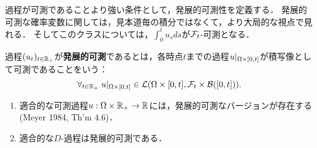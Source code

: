 \documentclass[uplatex,dvipdfmx]{jsreport}
\begin{document}
\begin{tcolorbox}[colframe=ForestGreen, colback=ForestGreen!10!white,breakable,colbacktitle=ForestGreen!40!white,coltitle=black,fonttitle=\bfseries\sffamily,
title=発展的可測性とは$\P/\B(\R)$-可測性である]
    過程が可測であることより強い条件として，発展的可測性を定義する．
    発展的可測な確率変数に関しては，見本道毎の積分ではなくて，より大局的な視点で見れる．
    そしてこのクラスについては，$\int^t_0u_sds$が$\mathcal{F}_t$-可測となる．
\end{tcolorbox}

\begin{definition}
    過程$(u_t)_{t\in\mathbb{R}_+}$が\textbf{発展的可測}であるとは，各時点$t$までの過程$u|_{\Omega\times[0,t]}$が積写像として可測であることをいう：
    \[\forall_{t\in\mathbb{R}_+}\;u|_{\Omega\times[0,t]}\in\mathcal{L}(\Omega\times[0,t],\mathcal{F}_t\times\mathcal{B}([0,t])).\]
\end{definition}

\begin{lemma}[発展的可測性の十分条件]\mbox{}
    \begin{enumerate}
        \item 適合的な可測過程$u:\Omega\times\mathbb{R}_+\to\mathbb{R}$には，発展的可測なバージョンが存在する(Meyer 1984, Th'm 4.6)．
        \item 適合的な$D$-過程は発展的可測である．
    \end{enumerate}
\end{lemma}
\end{document}
